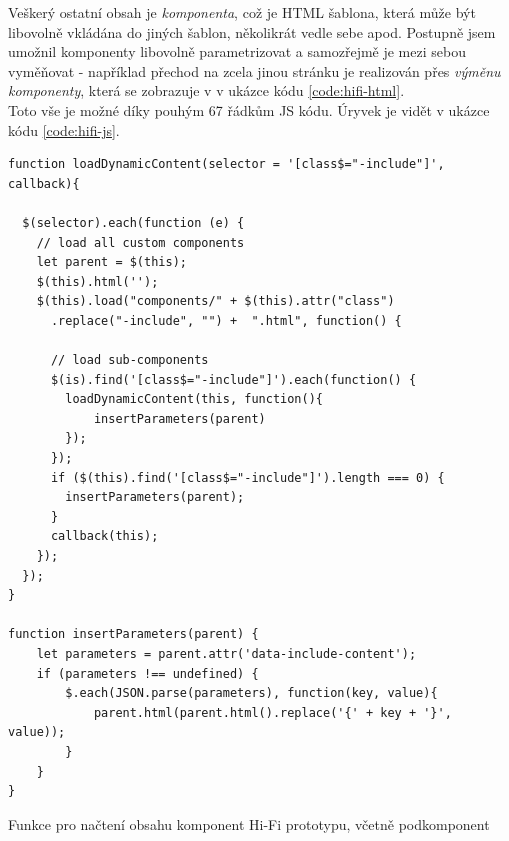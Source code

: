 Veškerý ostatní obsah je \emph{komponenta}, což je HTML šablona, která může být libovolně vkládána do jiných šablon, několikrát vedle sebe apod. Postupně jsem umožnil komponenty libovolně parametrizovat a samozřejmě je mezi sebou vyměňovat - například přechod na zcela jinou stránku je realizován přes \emph{výměnu komponenty}, která se zobrazuje v  v ukázce kódu \ref{code:hifi-html}.\\
Toto vše je možné díky pouhým 67 řádkům JS kódu. Úryvek je vidět v ukázce kódu \ref{code:hifi-js}.

\begin{listing}[H]
\begin{verbatim}
function loadDynamicContent(selector = '[class$="-include"]', callback){

  $(selector).each(function (e) {
    // load all custom components
    let parent = $(this);
    $(this).html('');
    $(this).load("components/" + $(this).attr("class")
      .replace("-include", "") +  ".html", function() {

      // load sub-components
      $(is).find('[class$="-include"]').each(function() {
        loadDynamicContent(this, function(){
            insertParameters(parent)
        });
      });
      if ($(this).find('[class$="-include"]').length === 0) {
        insertParameters(parent);
      }
      callback(this);
    });
  });
}

function insertParameters(parent) {
    let parameters = parent.attr('data-include-content');
    if (parameters !== undefined) {
        $.each(JSON.parse(parameters), function(key, value){
            parent.html(parent.html().replace('{' + key + '}', value));
        }
    }
}
\end{verbatim}
\caption{Funkce pro načtení obsahu komponent Hi-Fi prototypu, včetně podkomponent} \label{code:hifi-js}
\end{listing}


